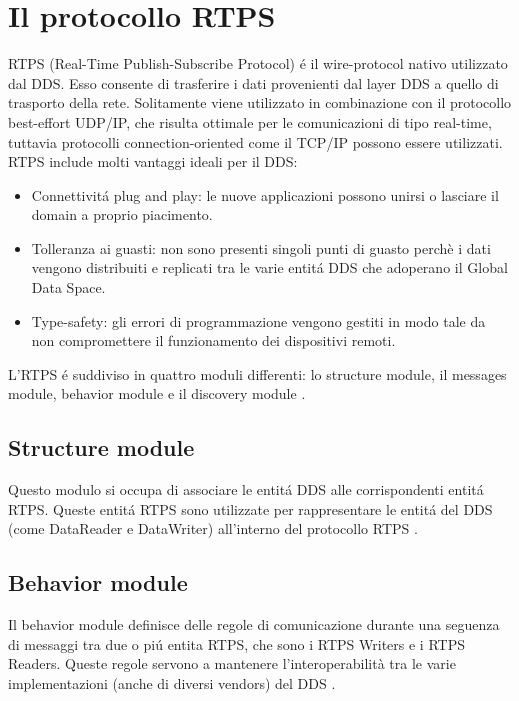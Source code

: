 \section{Il protocollo RTPS}
RTPS (Real-Time Publish-Subscribe Protocol) é il wire-protocol 
nativo utilizzato dal DDS. Esso consente di trasferire i dati provenienti
dal layer DDS a quello di trasporto della rete.
Solitamente viene utilizzato in combinazione con il protocollo
best-effort
UDP/IP, che risulta ottimale per le comunicazioni di tipo real-time, tuttavia 
protocolli connection-oriented come il TCP/IP possono essere utilizzati. 
RTPS include molti vantaggi ideali per il DDS:
\begin{itemize}
    \item Connettivitá plug and play: le nuove applicazioni possono unirsi o 
    lasciare il domain a proprio piacimento.
    \item Tolleranza ai guasti: non sono presenti singoli punti di 
    guasto perchè i dati vengono distribuiti e replicati tra le varie 
    entitá DDS che adoperano il Global Data Space.
    \item Type-safety: gli errori di programmazione vengono gestiti 
    in modo tale da non compromettere il funzionamento 
    dei dispositivi remoti.
\end{itemize}
L'RTPS é suddiviso in quattro moduli differenti: lo structure module, il 
messages module, behavior module e il discovery module \cite{ddsrtps}.

\subsection{Structure module}
Questo modulo si occupa di associare le entitá DDS alle corrispondenti
entitá RTPS. Queste entitá RTPS sono utilizzate 
per rappresentare le entitá del DDS (come DataReader e DataWriter) 
all'interno del protocollo RTPS \cite{ddsrtps}.

\subsection{Behavior module}
Il behavior module definisce delle regole di comunicazione durante 
una seguenza di messaggi tra
due o piú entita RTPS, che sono i RTPS Writers e i RTPS Readers.
Queste regole servono a mantenere l'interoperabilità tra le varie 
implementazioni (anche di diversi vendors) del DDS \cite{ddsrtps}.

